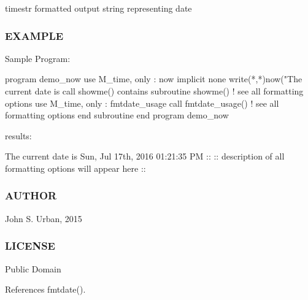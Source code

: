 timestr formatted output string representing date

\subsubsection*{E\+X\+A\+M\+P\+LE}

\begin{DoxyVerb}Sample Program:

 program demo_now
 use M_time, only : now
 implicit none
    write(*,*)now("The current date is %
    call showme()
 contains
 subroutine showme() ! see all formatting options
 use M_time, only : fmtdate_usage
    call fmtdate_usage() ! see all formatting options
 end subroutine
 end program demo_now

results:

   The current date is Sun, Jul 17th, 2016 01:21:35 PM
    ::
    :: description of all formatting options will appear here
    ::
\end{DoxyVerb}


\subsubsection*{A\+U\+T\+H\+OR}

John S. Urban, 2015 \subsubsection*{L\+I\+C\+E\+N\+SE}

Public Domain 

References fmtdate().

